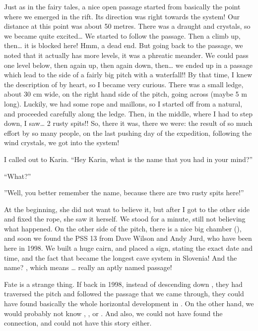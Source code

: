 Just as in the fairy tales, a nice open passage started from basically
the point where we emerged in the rift. Its direction was right towards
the system! Our distance at this point was about 50 metres. There was a
draught and crystals, so we became quite excited\ldots{} We started to
follow the passage. Then a climb up, then\ldots{} it is blocked here!
Hmm, a dead end. But going back to the passage, we noted that it
actually has more levels, it was a phreatic meander. We could pass one
level below, then again up, then again down, then\ldots{} we ended up in
a passage which lead to the side of a fairly big pitch with a
waterfall!! By that time, I knew the description of  by
heart, so I became very curious. There was a small ledge, about 30 cm
wide, on the right hand side of the pitch, going across (maybe 5 m
long). Luckily, we had some rope and maillons, so I started off from a
natural, and proceeded carefully along the ledge. Then, in the middle,
where I had to step down, I saw\ldots{} 2 rusty spits!! So, there it
was, there we were: the result of so much effort by so many people, on
the last pushing day of the expedition, following the wind crystals, we
got into the system!

I called out to Karin. ``Hey Karin, what is the name that you had in your mind?''

``What?''

''Well, you better remember the name, because
there are two rusty spits here!''

At the beginning, she did not want to
believe it, but after I got to the other side and fixed the rope, she
saw it herself. We stood for a minute, still not believing what
happened. On the other side of the pitch, there is a nice big chamber
(), and soon we found the PSS 13 from Dave Wilson and
Andy Jurd, who have been here in 1998. We built a huge cairn, and placed
a sign, stating the exact date and time, and the fact that  became the longest cave system in Slovenia! And the name?
, which means \ldots{}
really an aptly named passage!

Fate is a strange thing. If back in 1998, instead of descending down
, they had traversed the pitch and followed the passage
that we came through, they could have found basically the whole
horizontal development in . On the other hand, we would
probably not know , , or .
And also, we could not have found the connection, and could not have
this story either.

